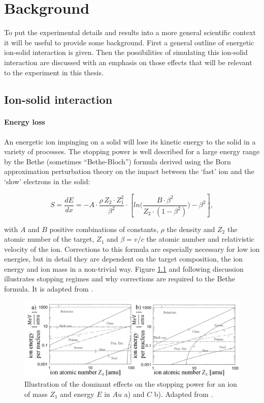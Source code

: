 \chapter{Background}


To put the experimental details and results into a more general scientific context it will be useful to provide some background. First a general outline of energetic ion-solid interaction is given. Then the possibilities of simulating this ion-solid interaction are discussed with an emphasis on those effects that will be relevant to the experiment in this thesis. 

\section{Ion-solid interaction}

\subsubsection{Energy loss}

An energetic ion impinging on a solid will lose its kinetic energy to the solid in a variety of processes. The stopping power is well described for a large energy range by the Bethe (sometimes ``Bethe-Bloch'') formula derived using the Born approximation perturbation theory on the impact between the `fast' ion and the `slow' electrons in the solid: 

\begin{equation}
S = \frac{dE}{dx} = - A \cdot \frac{\rho\,Z_2\cdot Z_1^2}{\beta^2} \cdot \left[ln\Big(\frac{B\cdot\beta^2}{Z_2\cdot(1-\beta^2)}\Big)-\beta^2\right] ,
\end{equation}


with $A$ and $B$ positive combinations of constants, $\rho$ the density and $Z_2$ the atomic number of the target, $Z_1$ and $\beta = v/c$ the atomic number and relativistic velocity of the ion. Corrections to this formula are especially necessary for low ion energies, but in detail they are dependent on the target composition, the ion energy and ion mass in a non-trivial way. Figure \ref{stopping} and following discussion illustrates stopping regimes and why corrections are required to the Bethe formula. It is adapted from \cite{sigmund_stopping_2004}.

\begin{figure}
	\centering
		\includegraphics[width=.95\textwidth]{images/StoppinginAuandC.png}
	\caption{Illustration of the dominant effects on the stopping power for an ion of mass $Z_1$ and energy $E$ in $Au$ a) and $C$ b). Adapted from \cite{sigmund_stopping_2004}.} 
	\label{stopping}
\end{figure} 

